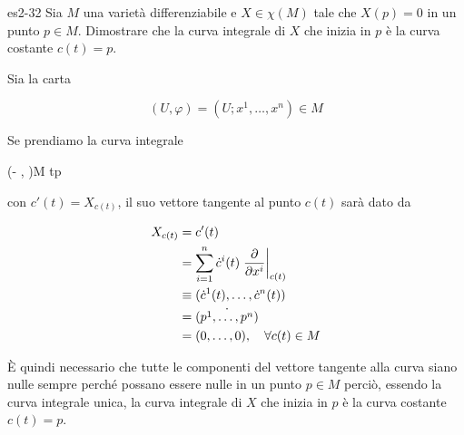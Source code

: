 
{es2-32}
{
Sia $ M $ una varietà differenziabile e $ X \in \chi(M) $ tale che $ X(p) = 0 $ in un punto $ p \in M $. Dimostrare che la curva integrale di $ X $ che inizia in $ p $ è la curva costante $ c(t) = p $.
}
{
Sia la carta

\begin{equation}
	(U, \varphi) = (U; x^{1},\dots,x^{n}) \in M
\end{equation}

Se prendiamo la curva integrale

	{(- \varepsilon, \varepsilon)}{M}
	{t}{p}

con $ c'(t) = X_{c(t)} $, il suo vettore tangente al punto $ c(t) $ sarà dato da

\begin{align}
	\begin{split}
		X_{c(t)} &= c'(t) \\
		&= \sum_{i=1}^{n} \dot{c}^{i}(t) \eval{ \pdv{x^{i}} }_{c(t)} \\
		&\equiv (\dot{c}^{1}(t), \dots, \dot{c}^{n}(t)) \\
		&= \dot{(p^{1}, \dots, p^{n})} \\
		&= (0,\dots,0) \qcomma \forall c(t) \in M
	\end{split}
\end{align}

È quindi necessario che tutte le componenti del vettore tangente alla curva siano nulle sempre perché possano essere nulle in un punto $ p \in M $ perciò, essendo la curva integrale unica, la curva integrale di $ X $ che inizia in $ p $ è la curva costante $ c(t) = p $.
}


